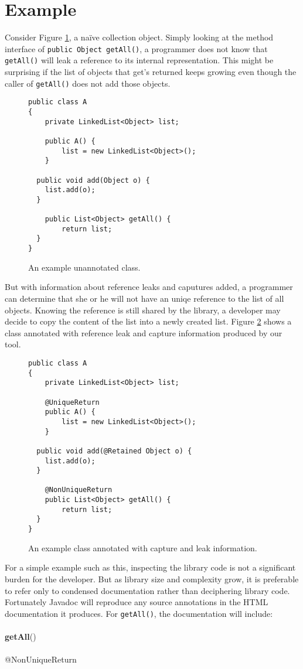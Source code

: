 \section{Example}
\label{sec:Example}

Consider Figure \ref{fig:pre}, a na\"ive collection object.
Simply looking at the method interface of 
\texttt{public Object getAll()}, a programmer does not know
that \texttt{getAll()} will leak a reference to its
internal representation. This might be surprising
if the list of objects that get's returned keeps growing
even though the caller of \texttt{getAll()} does not add those objects.

\begin{figure}[h]
\begin{lstlisting}
public class A
{
	private LinkedList<Object> list;
		
	public A() {
		list = new LinkedList<Object>();
	}
		
  public void add(Object o) {
   	list.add(o);
  }
    
	public List<Object> getAll() {
		return list;
  }
}
\end{lstlisting}
\label{fig:pre}
\caption{An example unannotated class.}
\end{figure}

But with information about reference leaks and caputures added, a programmer can 
determine that she or he will not have an uniqe reference
to the list of all objects.  Knowing the reference is still shared by the
library, a developer may decide to copy the content 
of the list into a newly created list.  Figure \ref{fig:postannotation}
shows a class annotated with reference leak and capture information produced by
our tool.

\begin{figure}[h]
\begin{lstlisting}
public class A
{
	private LinkedList<Object> list;
	
	@UniqueReturn
	public A() {
		list = new LinkedList<Object>();
	}
		
  public void add(@Retained Object o) {
   	list.add(o);
  }
  
	@NonUniqueReturn
	public List<Object> getAll() {
		return list;
  }
}
\end{lstlisting}
\label{fig:postannotation}
\caption{An example class annotated with capture and leak information.}
\end{figure}

For a simple example such as this, inspecting the library code is not a
significant burden for the developer.  But as library size and complexity grow,
it is preferable to refer only to condensed documentation rather than
deciphering library code.
Fortunately Javadoc will reproduce any source annotations in the HTML
documentation it produces.  For \texttt{getAll()}, the documentation will
include:\\
\\
{\bf getAll}()\\
\\
@NonUniqueReturn\\
